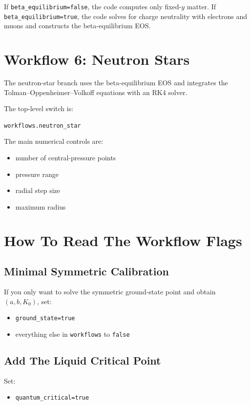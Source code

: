 \documentclass[11pt]{article}
\begin{document}
If \texttt{beta\_equilibrium=false}, the code computes only fixed-$y$ matter.
If \texttt{beta\_equilibrium=true}, the code solves for charge neutrality with
electrons and muons and constructs the beta-equilibrium EOS.

\section{Workflow 6: Neutron Stars}

The neutron-star branch uses the beta-equilibrium EOS and integrates the
Tolman--Oppenheimer--Volkoff equations with an RK4 solver.

The top-level switch is:
\begin{center}
\texttt{workflows.neutron\_star}
\end{center}

The main numerical controls are:

\begin{itemize}
\item number of central-pressure points
\item pressure range
\item radial step size
\item maximum radius
\end{itemize}

\section{How To Read The Workflow Flags}

\subsection{Minimal Symmetric Calibration}

If you only want to solve the symmetric ground-state point and obtain
$(a,b,K_0)$, set:
\begin{itemize}
\item \texttt{ground\_state=true}
\item everything else in \texttt{workflows} to \texttt{false}
\end{itemize}

\subsection{Add The Liquid Critical Point}

Set:
\begin{itemize}
\item \texttt{quantum\_critical=true}
\end{itemize}
\end{document}

